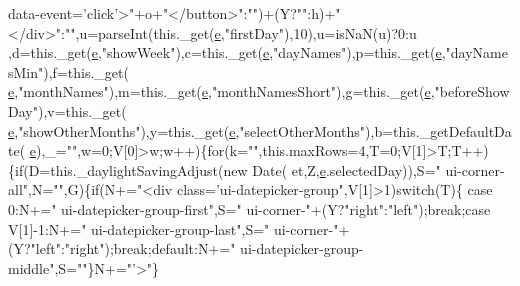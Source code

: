 \begin{DoxyCode}
{       data-event='click'>"}+o+\textcolor{stringliteral}{"</button>"}:\textcolor{stringliteral}{""})+(Y?\textcolor{stringliteral}{""}:h)+\textcolor{stringliteral}{"</div>"}:\textcolor{stringliteral}{""},u=parseInt(this.\_get(\hyperlink{jquery-ui_8min_8js_a2c038346d47955cbe2cb91e338edd7e1}{e},\textcolor{stringliteral}{"firstDay"}),10),u=isNaN(u)?0:u
      ,d=this.\_get(\hyperlink{jquery-ui_8min_8js_a2c038346d47955cbe2cb91e338edd7e1}{e},\textcolor{stringliteral}{"showWeek"}),c=this.\_get(\hyperlink{jquery-ui_8min_8js_a2c038346d47955cbe2cb91e338edd7e1}{e},\textcolor{stringliteral}{"dayNames"}),p=this.\_get(\hyperlink{jquery-ui_8min_8js_a2c038346d47955cbe2cb91e338edd7e1}{e},\textcolor{stringliteral}{"dayNamesMin"}),f=this.\_get(
      \hyperlink{jquery-ui_8min_8js_a2c038346d47955cbe2cb91e338edd7e1}{e},\textcolor{stringliteral}{"monthNames"}),m=this.\_get(\hyperlink{jquery-ui_8min_8js_a2c038346d47955cbe2cb91e338edd7e1}{e},\textcolor{stringliteral}{"monthNamesShort"}),g=this.\_get(\hyperlink{jquery-ui_8min_8js_a2c038346d47955cbe2cb91e338edd7e1}{e},\textcolor{stringliteral}{"beforeShowDay"}),v=this.\_get(
      \hyperlink{jquery-ui_8min_8js_a2c038346d47955cbe2cb91e338edd7e1}{e},\textcolor{stringliteral}{"showOtherMonths"}),y=this.\_get(\hyperlink{jquery-ui_8min_8js_a2c038346d47955cbe2cb91e338edd7e1}{e},\textcolor{stringliteral}{"selectOtherMonths"}),b=this.\_getDefaultDate(
      \hyperlink{jquery-ui_8min_8js_a2c038346d47955cbe2cb91e338edd7e1}{e}),\_=\textcolor{stringliteral}{""},w=0;V[0]>w;w++)\{\textcolor{keywordflow}{for}(k=\textcolor{stringliteral}{""},this.maxRows=4,T=0;V[1]>T;T++)\{\textcolor{keywordflow}{if}(D=this.\_daylightSavingAdjust(\textcolor{keyword}{new} Date(
      et,Z,\hyperlink{jquery-ui_8min_8js_a2c038346d47955cbe2cb91e338edd7e1}{e}.selectedDay)),S=\textcolor{stringliteral}{" ui-corner-all"},N=\textcolor{stringliteral}{""},G)\{\textcolor{keywordflow}{if}(N+=\textcolor{stringliteral}{"<div class='ui-datepicker-group"},V[1]>1)\textcolor{keywordflow}{switch}(T)\{\textcolor{keywordflow}{
      case} 0:N+=\textcolor{stringliteral}{" ui-datepicker-group-first"},S=\textcolor{stringliteral}{" ui-corner-"}+(Y?\textcolor{stringliteral}{"right"}:\textcolor{stringliteral}{"left"});\textcolor{keywordflow}{break};\textcolor{keywordflow}{case} V[1]-1:N+=\textcolor{stringliteral}{"
       ui-datepicker-group-last"},S=\textcolor{stringliteral}{" ui-corner-"}+(Y?\textcolor{stringliteral}{"left"}:\textcolor{stringliteral}{"right"});\textcolor{keywordflow}{break};\textcolor{keywordflow}{default}:N+=\textcolor{stringliteral}{" ui-datepicker-group-middle"},S=\textcolor{stringliteral}{""}\}N+=\textcolor{stringliteral}{"'>"}\}\textcolor{keywordflow}{
}
\end{DoxyCode}
